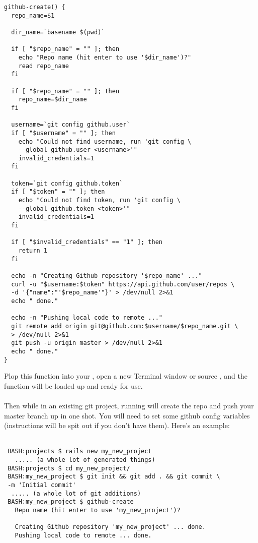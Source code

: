 \newpage
\begin{Verbatim}
github-create() {
  repo_name=$1
 
  dir_name=`basename $(pwd)`
 
  if [ "$repo_name" = "" ]; then
    echo "Repo name (hit enter to use '$dir_name')?"
    read repo_name
  fi
 
  if [ "$repo_name" = "" ]; then
    repo_name=$dir_name
  fi
 
  username=`git config github.user`
  if [ "$username" = "" ]; then
    echo "Could not find username, run 'git config \
    --global github.user <username>'"
    invalid_credentials=1
  fi
 
  token=`git config github.token`
  if [ "$token" = "" ]; then
    echo "Could not find token, run 'git config \
    --global github.token <token>'"
    invalid_credentials=1
  fi
 
  if [ "$invalid_credentials" == "1" ]; then
    return 1
  fi
 
  echo -n "Creating Github repository '$repo_name' ..."
  curl -u "$username:$token" https://api.github.com/user/repos \
  -d '{"name":"'$repo_name'"}' > /dev/null 2>&1
  echo " done."
 
  echo -n "Pushing local code to remote ..."
  git remote add origin git@github.com:$username/$repo_name.git \
  > /dev/null 2>&1
  git push -u origin master > /dev/null 2>&1
  echo " done."
}
\end{Verbatim}

\noindent Plop this function into your , open a new
Terminal window or source , and the function
will be loaded up and ready for use.
\\
\\
Then while in an existing git project, running \cmd{github-create}
will create the repo and push your master branch up in one shot.
You will need to set some github config variables (instructions
will be spit out if you don't have them).  Here’s an example:
\\
\\
\begin{Verbatim}
 BASH:projects $ rails new my_new_project
   ..... (a whole lot of generated things)
 BASH:projects $ cd my_new_project/
 BASH:my_new_project $ git init && git add . && git commit \
 -m 'Initial commit'
  ..... (a whole lot of git additions)
 BASH:my_new_project $ github-create
   Repo name (hit enter to use 'my_new_project')?
 
   Creating Github repository 'my_new_project' ... done.
   Pushing local code to remote ... done.
\end{Verbatim}

